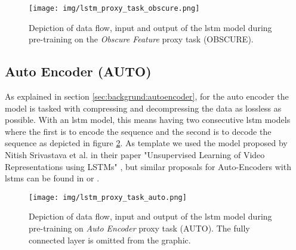 \begin{figure}[]
	\centering
	\texttt{[image: img/lstm\_proxy\_task\_obscure.png]}
	\caption{Depiction of data flow, input and output of the \gls{lstm} model during pre-training on the \textit{Obscure Feature} proxy task (OBSCURE). }
	\label{fig:experiments:lstm_proxy_task_obscure}
\end{figure}

\subsection{Auto Encoder (AUTO)} \label{sec:experiments:lstm:auto_encoder}

As explained in section \ref{sec:backgrund:autoencoder}, for the auto encoder the model is tasked with compressing and decompressing the data as lossless as possible. With an \gls{lstm} model, this means having two consecutive \gls{lstm} models where the first is to encode the sequence and the second is to decode the sequence as depicted in figure \ref{fig:experiments:lstm_proxy_task_auto}. As template we used the model proposed by Nitish Srivastava et al. in their paper "Unsupervised Learning of Video Representations using LSTMs" \cite{unsupervised_learning_lstms}, but similar proposals for Auto-Encoders with \glspl{lstm} can be found in \cite{unsupervised_learning_lstms_timeseries} or \cite{lstm_anomaly_detection}. \par

\begin{figure}[]
	\centering
	\texttt{[image: img/lstm\_proxy\_task\_auto.png]}
	\caption{Depiction of data flow, input and output of the \gls{lstm} model during pre-training on \textit{Auto Encoder} proxy task (AUTO). The fully connected layer is omitted from the graphic. }
	\label{fig:experiments:lstm_proxy_task_auto}
\end{figure}

